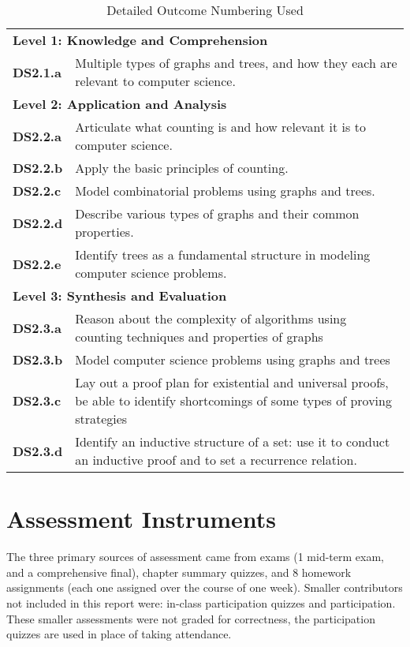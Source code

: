 \documentclass[11pt]{article}
\begin{document}
\begin{table}
    \centering
    \caption{Detailed Outcome Numbering Used}
    {\small
    \label{tab:outcomes}
    \begin{tabularx}{\linewidth}{|l|X|}
    
\hline \multicolumn{2}{|l|}{\textbf{Level 1: Knowledge and Comprehension }}\\
\textbf{DS2.1.a} & Multiple types of graphs and trees, and how they each are relevant to computer science.\\
\hline \multicolumn{2}{|l|}{\textbf{Level 2: Application and Analysis }}\\
\textbf{DS2.2.a} & Articulate what counting is and how relevant it is to computer science.\\
\textbf{DS2.2.b} & Apply the basic principles of counting. \\
\textbf{DS2.2.c} & Model combinatorial problems using graphs and trees. \\
\textbf{DS2.2.d} & Describe various types of graphs and their common properties.\\
\textbf{DS2.2.e} & Identify trees as a fundamental structure in modeling computer science problems.\\
\hline \multicolumn{2}{|l|}{\textbf{Level 3: Synthesis and Evaluation }}\\
\textbf{DS2.3.a} & Reason about the complexity of algorithms using counting techniques and properties of graphs\\
\textbf{DS2.3.b} & Model computer science problems using graphs and trees\\
\textbf{DS2.3.c} & Lay out a proof plan for existential and universal proofs, be able to identify shortcomings of some types of proving strategies \\
\textbf{DS2.3.d} & Identify an inductive structure of a set: use it to conduct an inductive proof and to set a recurrence relation.\\

\hline \hline
    \end{tabularx}
    }
\end{table}

\section{Assessment Instruments}
\label{sec:assessment}
The three primary sources of assessment came from exams (1 mid-term exam, and a comprehensive final),
chapter summary quizzes, 
and 8 homework assignments (each one assigned over the course of one week). 
Smaller contributors not included in this report were: in-class participation quizzes and participation. 
These smaller assessments were not graded for correctness, 
the participation quizzes are used in place of taking attendance. 
\end{document}
